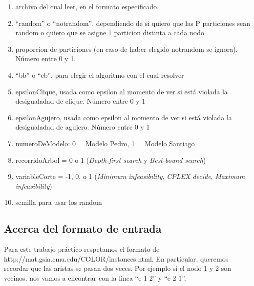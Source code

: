 \documentclass[a4paper, 10pt, twoside]{article}
\begin{document}
\begin{enumerate}
 \item archivo del cual leer, en el formato especificado.
 \item ``random'' o ``notrandom'', dependiendo de si quiero que las P particiones sean random o quiero que se asigne 1 particion distinta a cada nodo
 \item proporcion de particiones (en caso de haber elegido notrandom se ignora). Número entre 0 y 1.
 \item ``bb'' o ``cb'', para elegir el algoritmo con el cual resolver
 \item epsilonClique, usada como epsilon al momento de ver si está violada la desigualadad de clique. Número entre 0 y 1
 \item epsilonAgujero, usada como epsilon al momento de ver si está violada la desigualadad de agujero. Número entre 0 y 1
 \item numeroDeModelo: 0 = Modelo Pedro, 1 = Modelo Santiago
 \item recorridoArbol = 0 o 1 (\emph{Depth-first search} y \emph{Best-bound search}) 
 \item variableCorte = -1, 0, o 1 (\emph{Minimum infeasibility}, \emph{CPLEX decide}, \emph{Maximum infeasibility})
 \item semilla para usar los random
\end{enumerate}

\subsection{Acerca del formato de entrada}

Para este trabajo práctico respetamos el formato de http://mat.gsia.cmu.edu/COLOR/instances.html. En particular, queremos recordar que las aristas se pasan dos veces. Por ejemplo si el nodo 1 y 2 son vecinos, nos vamos a encontrar con la linea ``e 1 2'' y ``e 2 1''.
\end{document}
